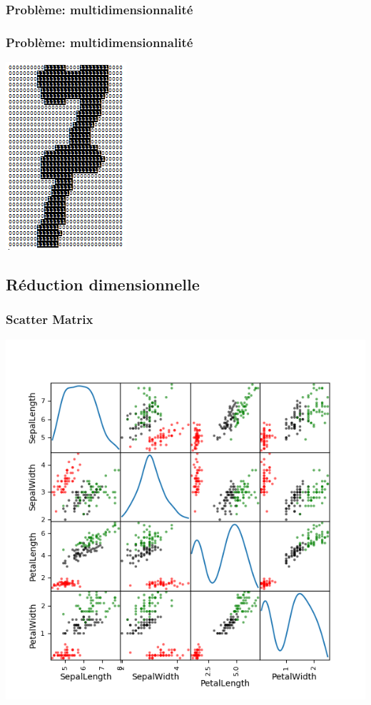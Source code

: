 \documentclass[11pt]{beamer}
\newenvironment{slide}[1]{%
\begin{frame}[environment=slide]
\frametitle{#1}
}{%
\end{frame}
}
\begin{document}
\begin{slide}{Problème: multidimensionnalité}
\begin{center}
{\tiny }
\end{center}
\end{slide}

\begin{slide}{Problème: multidimensionnalité}
\begin{center}
\includegraphics[scale=.75]{optdigits-7}
\end{center}
\end{slide}

\subsection{Réduction dimensionnelle}

\begin{slide}{Scatter Matrix}
\begin{center}
\includegraphics[scale=0.4]{iris_matrix}
\end{center}
\end{slide}
\end{document}
